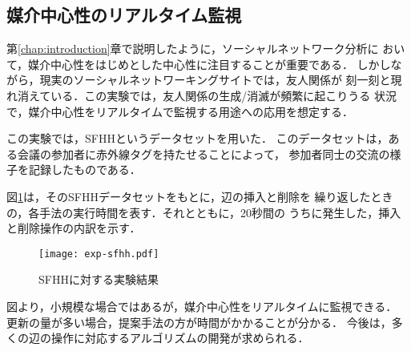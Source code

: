 \subsection{媒介中心性のリアルタイム監視}
\label{subsect:exp-sfhh}

第\ref{chap:introduction}章で説明したように，ソーシャルネットワーク分析に
おいて，媒介中心性をはじめとした中心性に注目することが重要である．
しかしながら，現実のソーシャルネットワーキングサイトでは，友人関係が
刻一刻と現れ消えている．この実験では，友人関係の生成/消滅が頻繁に起こりうる
状況で，媒介中心性をリアルタイムで監視する用途への応用を想定する．

この実験では，SFHH\cite{Genois2018}というデータセットを用いた．
このデータセットは，ある会議の参加者に赤外線タグを持たせることによって，
参加者同士の交流の様子を記録したものである．

図\ref{fig:exp-sfhh}は，そのSFHHデータセットをもとに，辺の挿入と削除を
繰り返したときの，各手法の実行時間を表す．それとともに，20秒間の
うちに発生した，挿入と削除操作の内訳を示す．

\begin{figure}[tb]
  \centering
  \texttt{[image: exp-sfhh.pdf]}
  \caption{SFHHに対する実験結果}
  \label{fig:exp-sfhh}
\end{figure}

図より，小規模な場合ではあるが，媒介中心性をリアルタイムに監視できる．
更新の量が多い場合，提案手法の方が時間がかかることが分かる．
今後は，多くの辺の操作に対応するアルゴリズムの開発が求められる．
